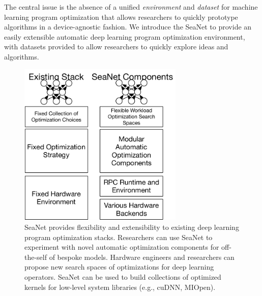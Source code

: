 The central issue is the absence of a unified \emph{environment} and \emph{dataset} for machine learning program optimization that allows researchers to quickly prototype algorithms in a device-agnostic fashion.
We introduce the SeaNet to provide an easily extensible automatic deep learning program optimization environment, with datasets provided to allow researchers to quickly explore ideas and algorithms.
\begin{figure}[ht]
\includegraphics[width=0.7\textwidth]{sys_diagrams/overview2.pdf}
\caption{SeaNet provides flexibility and extensibility to existing deep learning program optimization stacks.
Researchers can use SeaNet to experiment with novel automatic optimization components for off-the-self of bespoke models. Hardware engineers and researchers can propose new search spaces of optimizations for deep learning operators. SeaNet can be used to build collections of optimized kernels for low-level system libraries (e.g., cuDNN, MIOpen).}
\end{figure}


